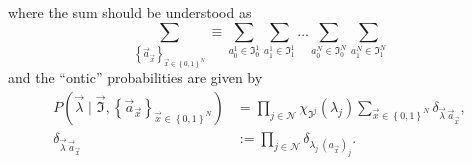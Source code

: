\documentclass[a4paper,onecolumn,11pt,accepted=2018-05-04]{quantumarticle}
\begin{document}
where the sum should be understood as
\begin{equation}
\sum_{\left\{\vec{a}_{\vec{x}}\right\}_{\vec{x}\in \left\{0,1\right\}^N} }\equiv \sum_{a^1_{0} \in \mathfrak{I}^1_{0}} \sum_{a^1_{1} \in \mathfrak{I}^1_{1}} \dots \sum_{a^N_{0} \in \mathfrak{I}^N_{0}} \sum_{a^N_{1} \in \mathfrak{I}^N_{1}}
\end{equation}
%
and the ``ontic'' probabilities are given by
\begin{align} \label{detprob}
P\left(\vec{\lambda}\mid \vec{\mathfrak{I}}, \left\{\vec{a}_{\vec{x}}\right\}_{\vec{x}\in \left\{0,1\right\}^N}\right) 
&= \prod_{j\in \mathcal{N}}\chi_{\mathfrak{I}^j}(\lambda_j) 
\sum_{\vec{x}\in \left\{0,1\right\}^N} \delta_{\vec{\lambda}\,\vec{a}_{\vec{x}}}, \\
\delta_{\vec{\lambda}\,\vec{a}_{\vec{x}}} &
:= \prod_{j\in \mathcal{N}} \delta_{\lambda_j\,(a_{\vec{x}})_j}.
\end{align}
%
\end{document}
